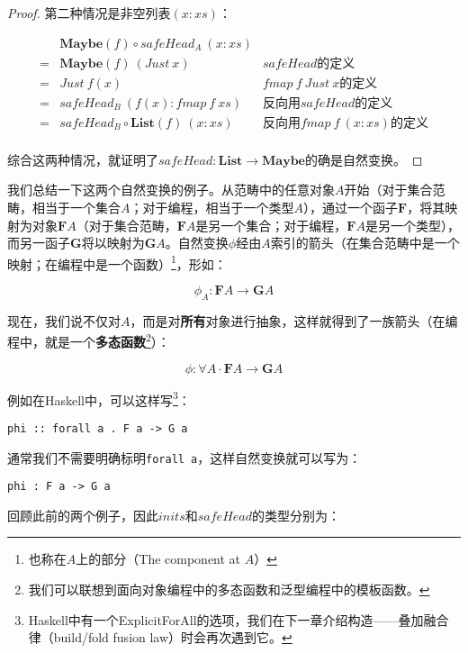 \documentclass{article}
\begin{document}
\begin{example}
\begin{proof}
第二种情况是非空列表$(x:xs)$：

\[
\begin{array}{cll}
  & \mathbf{Maybe}(f) \circ safeHead_A\ (x:xs) & \\
= & \mathbf{Maybe}(f)\ (Just\ x) & \text{$safeHead$的定义} \\
= & Just\ f(x) & \text{$fmap\ f\ Just\ x$的定义} \\
= & safeHead_B\ (f(x) : fmap\ f\ xs) & \text{反向用$safeHead$的定义} \\
= & safeHead_B \circ \mathbf{List}(f)\ (x:xs) & \text{反向用$fmap\ f\ (x:xs)$的定义} \\
\end{array}
\]

综合这两种情况，就证明了$safeHead : \mathbf{List} \to \mathbf{Maybe}$的确是自然变换。
\end{proof}
\end{example}

我们总结一下这两个自然变换的例子。从范畴中的任意对象$A$开始（对于集合范畴，相当于一个集合$A$；对于编程，相当于一个类型$A$），通过一个函子$\mathbf{F}$，将其映射为对象$\mathbf{F}A$（对于集合范畴，$\mathbf{F}A$是另一个集合；对于编程，$\mathbf{F}A$是另一个类型），而另一函子$\mathbf{G}$将以映射为$\mathbf{G}A$。自然变换$\phi$经由$A$索引的箭头（在集合范畴中是一个映射；在编程中是一个函数）\footnote{也称在$A$上的部分（The component at $A$）}，形如：

\[
\phi_A : \mathbf{F} A \to \mathbf{G} A
\]

现在，我们说不仅对$A$，而是对\textbf{所有}对象进行抽象，这样就得到了一族箭头（在编程中，就是一个\textbf{多态函数}\footnote{我们可以联想到面向对象编程中的多态函数和泛型编程中的模板函数。}）：

\[
\phi : \forall A \cdot \mathbf{F} A \to \mathbf{G} A
\]

例如在Haskell中，可以这样写\footnote{Haskell中有一个ExplicitForAll的选项，我们在下一章介绍构造——叠加融合律（build/fold fusion law）时会再次遇到它。}：

\lstset{frame=single}
\begin{lstlisting}
phi :: forall a . F a -> G a
\end{lstlisting}

通常我们不需要明确标明\texttt{forall a}，这样自然变换就可以写为：

\begin{lstlisting}
phi : F a -> G a
\end{lstlisting}

回顾此前的两个例子，因此$inits$和$safeHead$的类型分别为：
\end{document}
